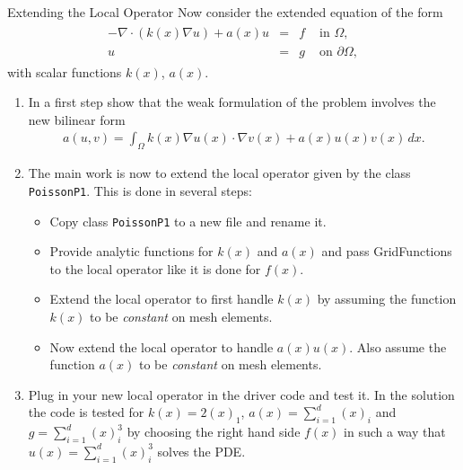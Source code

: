 \documentclass[12pt,a4paper]{article}
\begin{document}
\begin{Exercise}{Extending the Local Operator}
Now consider the extended equation of the form
\begin{align}
    \begin{array}{rcll}
      -\nabla\cdot (k(x) \nabla u) +a(x) u  & = & f & \text{ in } \Omega, \\
      u & = & g & \text{ on } \partial\Omega,
    \end{array}
\end{align}
with scalar functions $k(x)$, $a(x)$.

\begin{enumerate}
\item In a first step show that the weak formulation of the problem
  involves the new bilinear form
  \begin{align}
    a(u,v) = \int_\Omega k(x) \nabla u(x) \cdot \nabla v(x) + a(x) u(x) v(x) \,dx .
  \end{align}
\item The main work is now to extend the local operator given by the
  class \lstinline{PoissonP1}. This is done in several steps:
  \begin{itemize}
  \item Copy class \lstinline{PoissonP1} to a new file and rename it.
  \item Provide analytic functions for $k(x)$ and $a(x)$ and pass
    GridFunctions to the local operator like it is done for $f(x)$.
  \item Extend the local operator to first handle $k(x)$ by assuming the
    function $k(x)$ to be \emph{constant} on mesh elements.
  \item Now extend the local operator to handle $a(x) u(x)$. Also assume
    the function $a(x)$ to be \emph{constant} on mesh elements.
  \end{itemize}
\item Plug in your new local operator in the driver code and test it.
  In the solution the code is tested for $k(x)=2(x)_1$,
  $a(x)=\sum_{i=1}^{d}(x)_i$ and $g=\sum_{i=1}^d (x)_i^3$ by choosing
  the right hand side $f(x)$ in such a way that $u(x)=\sum_{i=1}^d
  (x)_i^3$ solves the PDE.
\end{enumerate}
\end{Exercise}
\end{document}
